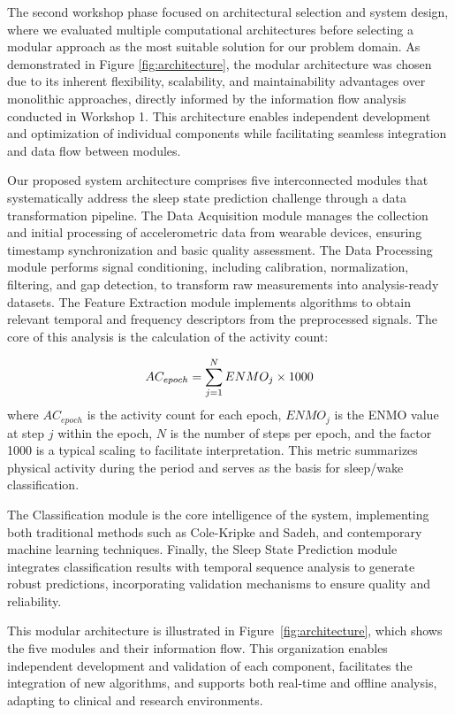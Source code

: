 \documentclass[conference]{IEEEtran}
\begin{document}
The second workshop phase focused on architectural selection and system design, where we evaluated multiple computational architectures before selecting a modular approach as the most suitable solution for our problem domain. As demonstrated in Figure \ref{fig:architecture}, the modular architecture was chosen due to its inherent flexibility, scalability, and maintainability advantages over monolithic approaches, directly informed by the information flow analysis conducted in Workshop 1. This architecture enables independent development and optimization of individual components while facilitating seamless integration and data flow between modules.

Our proposed system architecture comprises five interconnected modules that systematically address the sleep state prediction challenge through a data transformation pipeline. The Data Acquisition module manages the collection and initial processing of accelerometric data from wearable devices, ensuring timestamp synchronization and basic quality assessment. The Data Processing module performs signal conditioning, including calibration, normalization, filtering, and gap detection, to transform raw measurements into analysis-ready datasets. The Feature Extraction module implements algorithms to obtain relevant temporal and frequency descriptors from the preprocessed signals. The core of this analysis is the calculation of the activity count:

\begin{equation}
	\scriptsize
	AC_{epoch} = \sum_{j=1}^{N} ENMO_j \times 1000
\end{equation}
where $AC_{epoch}$ is the activity count for each epoch, $ENMO_j$ is the ENMO value at step $j$ within the epoch, $N$ is the number of steps per epoch, and the factor 1000 is a typical scaling to facilitate interpretation. This metric summarizes physical activity during the period and serves as the basis for sleep/wake classification.

The Classification module is the core intelligence of the system, implementing both traditional methods such as Cole-Kripke and Sadeh, and contemporary machine learning techniques. Finally, the Sleep State Prediction module integrates classification results with temporal sequence analysis to generate robust predictions, incorporating validation mechanisms to ensure quality and reliability.

This modular architecture is illustrated in Figure~\ref{fig:architecture}, which shows the five modules and their information flow. This organization enables independent development and validation of each component, facilitates the integration of new algorithms, and supports both real-time and offline analysis, adapting to clinical and research environments.
\end{document}
